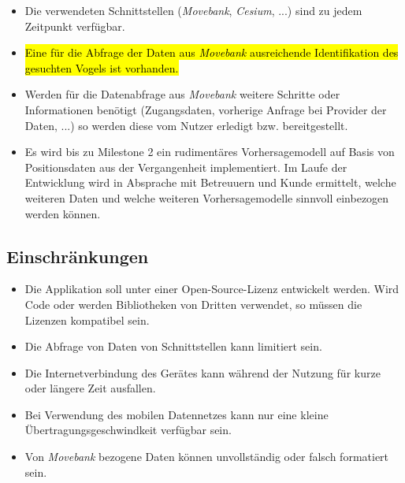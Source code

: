 \documentclass[12pt]{article} %
\begin{document}
\begin{itemize} 
 	 \item Die verwendeten Schnittstellen (\textit{Movebank}, \textit{Cesium}, ...) sind zu jedem Zeitpunkt verfügbar.
 	 \item \hl{Eine für die Abfrage der Daten aus \textit{Movebank} ausreichende Identifikation des gesuchten Vogels ist vorhanden. }
 	 \item Werden für die Datenabfrage aus \textit{Movebank} weitere Schritte oder Informationen benötigt (Zugangsdaten, vorherige Anfrage bei Provider der Daten, ...) so werden diese vom Nutzer erledigt bzw. bereitgestellt.
 	 \item Es wird bis zu Milestone 2 ein rudimentäres Vorhersagemodell auf Basis von Positionsdaten aus der Vergangenheit implementiert. Im Laufe der Entwicklung wird in Absprache mit Betreuuern und Kunde ermittelt, welche weiteren Daten und welche weiteren Vorhersagemodelle sinnvoll einbezogen werden können.
\end{itemize} 


\subsection{Einschränkungen}

\begin{itemize} 
	\item Die Applikation soll unter einer Open-Source-Lizenz entwickelt werden. Wird Code oder werden Bibliotheken von Dritten verwendet, so müssen die Lizenzen kompatibel sein.
	\item Die Abfrage von Daten von Schnittstellen kann limitiert sein.
	\item Die Internetverbindung des Gerätes kann während der Nutzung für kurze oder längere Zeit ausfallen.
	\item Bei Verwendung des mobilen Datennetzes kann nur eine kleine Übertragungsgeschwindkeit verfügbar sein.
	\item Von \textit{Movebank} bezogene Daten können unvollständig oder falsch formatiert sein.
\end{itemize} 

\end{document}
